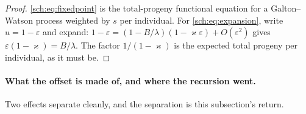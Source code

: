 \begin{proof}
\eqref{sch:eq:fixedpoint} is the total-progeny functional equation for a
Galton--Watson process weighted by $s$ per individual. For
\eqref{sch:eq:expansion}, write $u=1-\varepsilon$ and expand:
$1-\varepsilon=(1-B/\lambda)(1-\varkappa\varepsilon)+O(\varepsilon^{2})$
gives $\varepsilon(1-\varkappa)=B/\lambda$. The factor $1/(1-\varkappa)$ is the expected total
progeny per individual, as it must be.
\end{proof}

\paragraph{What the offset is made of, and where the recursion
went.}\label{sch:rem:cefff}
Two effects separate cleanly, and the separation is this subsection's
return.

